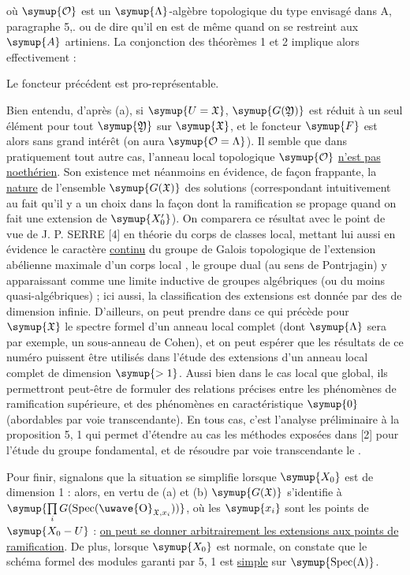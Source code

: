 où $\symup{\mathcal O}$ est un $\symup{\Lambda}$-algèbre topologique du type envisagé dans A,
paragraphe 5,. ou de dire qu'il en est de même quand on se restreint aux $\symup{A}$
artiniens. La conjonction des théorèmes 1 et 2 implique alors effectivement :

 Le foncteur précédent est pro-représentable.

Bien entendu, d'après (a), si $\symup{U=\mathfrak X}$, $\symup{G(\mathfrak Y)}$ est réduit à
un seul élément pour tout $\symup{\mathfrak Y}$ sur $\symup{\mathfrak X}$, et le foncteur $\symup{F}$
est alors sans grand intérêt (on aura $\symup{\mathcal O=\Lambda}$). Il semble que dans
pratiquement tout autre cas, l'anneau local topologique $\symup{\mathcal O}$ \uline{n'est pas
noethérien}. Son existence met néanmoins en évidence, de façon frappante, la
\uline{nature}  de l'ensemble $\symup{G(\mathfrak X)}$ des solutions
(correspondant intuitivement au fait qu'il y a un choix  dans la
façon dont la ramification se propage quand on fait une extension de $\symup{X'_0}$).
On comparera ce résultat avec le point de vue de J. P. SERRE [4] en théorie du
corps de classes local, mettant lui aussi en évidence le caractère \uline{continu} du
groupe de Galois topologique de l'extension abélienne maximale d'un corps local
, le groupe dual (au sens de Pontrjagin) y apparaissant comme
une limite inductive de groupes algébriques (ou du moins quasi-algébriques) ;
ici aussi, la classification des extensions est donnée par des  de
dimension infinie. D'ailleurs, on peut prendre dans ce qui précède pour
$\symup{\mathfrak X}$ le spectre formel d'un anneau local complet (dont $\symup{\Lambda}$ sera
par exemple, un sous-anneau de Cohen), et on peut espérer que les résultats de
ce numéro puissent être utilisés dans l'étude des extensions d'un anneau local
complet de dimension $\symup{>1}$. Aussi bien dans le cas local que global, ils
permettront peut-être de formuler des relations précises entre les phénomènes
de ramification supérieure, et des phénomènes en caractéristique $\symup{0}$
(abordables par voie transcendante). En tous cas, c'est l'analyse préliminaire
à la proposition 5, 1 qui permet d'étendre au cas  les
méthodes exposées dans [2] pour l'étude du groupe fondamental, et de résoudre
par voie transcendante le .

Pour finir, signalons que la situation se simplifie lorsque $\symup{X_0}$ est de dimension 1 : alors, en vertu de (a) et (b) $\symup{G(\mathfrak X)}$ s'identifie à $\symup{\prod\limits_i G(\operatorname{Spec}(\text{\uwave{O}}_{\mathfrak X,x_i}))}$, où les $\symup{x_i}$ sont les points de $\symup{X_0-U}$ : \uline{on peut se donner arbitrairement les extensions  aux points de ramification}. De plus, lorsque $\symup{X_0}$ est normale, on constate que le schéma formel des modules garanti par 5, 1 est \uline{simple} sur $\symup{\operatorname{Spec}(\Lambda)}$.

